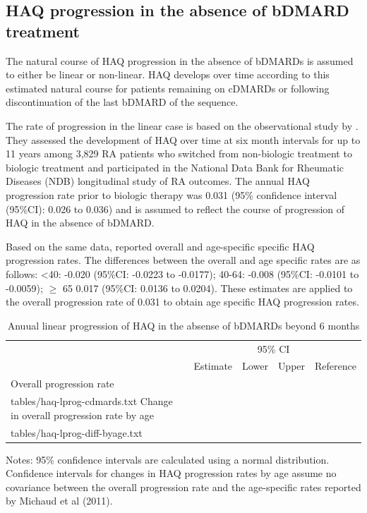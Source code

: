 \documentclass[11pt,final,fleqn]{article}\usepackage[]{graphicx}\usepackage[]{color}
\makeatletter
\theoremstyle{plain}
\newcommand*\ExpandableInput[1]{\@@input#1 }
\makeatother
\begin{document}
\subsection{HAQ progression in the absence of bDMARD
treatment}\label{haq-progression-in-the-absence-of-bdmard-treatment}

The natural course of HAQ progression in the absence of bDMARDs is
assumed to either be linear or non-linear. HAQ develops over time
according to this estimated natural course for patients remaining on
cDMARDs or following discontinuation of the last bDMARD of the sequence.

The rate of progression in the linear case is based on the observational study by \citet{wolfe2010loss}. They assessed the development of HAQ over time at six month intervals for up to 11 years among 3,829 RA patients who switched from non-biologic treatment to biologic treatment and participated in the National Data Bank for Rheumatic Diseases (NDB) longitudinal study of RA outcomes. The annual HAQ progression rate prior to biologic therapy was 0.031 (95\% confidence interval (95\%CI): 0.026 to 0.036) and is assumed to reflect the course of progression of HAQ in the absence of bDMARD.

Based on the same data, \citet{michaud2011treatment} reported overall
and age-specific specific HAQ progression rates. The differences between
the overall and age specific rates are as follows: \textless{}40: -0.020
(95\%CI: -0.0223 to -0.0177); 40-64: -0.008 (95\%CI: -0.0101 to
-0.0059); \(\geq\) 65 0.017 (95\%CI: 0.0136 to 0.0204). These estimates
are applied to the overall progression rate of 0.031 to obtain age
specific HAQ progression rates.



\begin{table}[!ht]
\begin{center}
\begin{threeparttable}
\caption{Anuual linear progression of HAQ in the absense of bDMARDs beyond 6 months} \label{tbl:haq-lprog}
\footnotesize
\begin{tabularx}{\textwidth}{@{\extracolsep{\fill}}lrrrl}
\hline
\multicolumn{2}{l}{} & \multicolumn{2}{c}{95\% CI} & \multicolumn{1}{l}{} \\
\cmidrule{3-4} 
\multicolumn{1}{l}{} & \multicolumn{1}{r}{Estimate} & \multicolumn{1}{r}{Lower} & \multicolumn{1}{r}{Upper} & \multicolumn{1}{l}{Reference} \\
\hline
Overall progression rate \\
\ExpandableInput{tables/haq-lprog-cdmards.txt}
Change in overall progression rate by age \\
\ExpandableInput{tables/haq-lprog-diff-byage.txt}
\hline
\end{tabularx}
\scriptsize
Notes: 95\% confidence intervals are calculated using a normal distribution. Confidence intervals for changes in HAQ progression rates by age assume no covariance between the overall progression rate and the age-specific rates reported by Michaud et al (2011).
\end{threeparttable}
\end{center}
\end{table}
\end{document}

